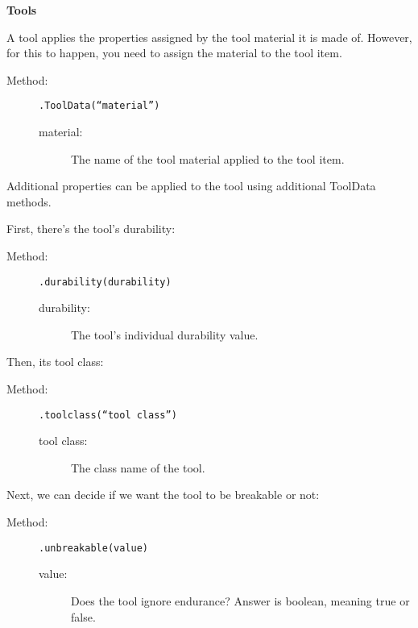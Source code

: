 \documentclass[letterpaper,titlepage,12pt]{article}
\begin{document}
\vspace{2em}
\textbf{Tools}
\vspace{1em}

A tool applies the properties assigned by the tool material it is made of.  However, for this to happen, you need to assign the material to the tool item.

\begin{description}
\item[Method:] \texttt{.ToolData(``material'')}
\begin{description}
\item [material:] The name of the tool material applied to the tool item.
\end{description}
\end{description}

Additional properties can be applied to the tool using additional ToolData methods.

First, there's the tool's durability:

\begin{description}
\item[Method:] \texttt{.durability(durability)}
\begin{description}
\item [durability:] The tool's individual durability value.
\end{description}
\end{description}

Then, its tool class:

\begin{description}
\item[Method:] \texttt{.toolclass(``tool class'')}
\begin{description}
\item [tool class:] The class name of the tool.
\end{description}
\end{description}

Next, we can decide if we want the tool to be breakable or not:

\begin{description}
\item[Method:] \texttt{.unbreakable(value)}
\begin{description}
\item [value:] Does the tool ignore endurance?  Answer is boolean, meaning true or false.
\end{description}
\end{description}
\end{document}
